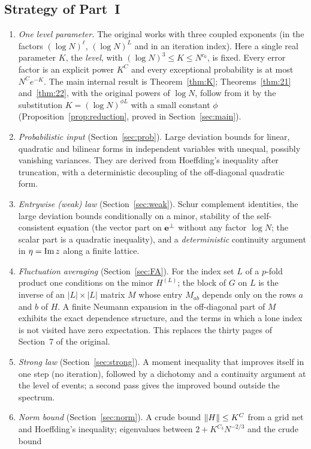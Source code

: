 \subsection{Strategy of Part~I}
\begin{enumerate}[leftmargin=2em,itemsep=2pt]
\item \emph{One level parameter.} The original works with three coupled exponents (in the factors $(\log N)^{\ell}$, $(\log N)^{L}$ and in an iteration index).
Here a single real parameter $K$, the \emph{level}, with $(\log N)^3\le K\le N^{c_0}$, is fixed. Every error factor is an explicit power $K^{C}$ and every exceptional
probability is at most $N^{C}e^{-K}$. The main internal result is Theorem~\ref{thm:K}; Theorems~\ref{thm:21} and~\ref{thm:22}, with the original powers of $\log N$, follow
from it by the substitution $K=(\log N)^{\phi L}$ with a small constant $\phi$ (Proposition~\ref{prop:reduction}, proved in Section~\ref{sec:main}).
\item \emph{Probabilistic input} (Section~\ref{sec:prob}). Large deviation bounds for linear, quadratic and bilinear forms in independent variables with unequal, possibly
vanishing variances. They are derived from Hoeffding's inequality after truncation, with a deterministic decoupling of the off-diagonal quadratic form.
\item \emph{Entrywise (weak) law} (Section~\ref{sec:weak}). Schur complement identities, the large deviation bounds conditionally on a minor, stability of the self-consistent
equation (the vector part on $\mathbf{e}^\perp$ without any factor $\log N$; the scalar part is a quadratic inequality), and a \emph{deterministic} continuity argument in
$\eta=\operatorname{Im} z$ along a finite lattice.
\item \emph{Fluctuation averaging} (Section~\ref{sec:FA}). For the index set $L$ of a $p$-fold product one conditions on the minor $H^{(L)}$; the block of $G$ on $L$ is the inverse of an
$|L|\times|L|$ matrix $M$ whose entry $M_{ab}$ depends only on the rows $a$ and $b$ of $H$. A finite Neumann expansion in the off-diagonal part of $M$ exhibits the exact dependence
structure, and the terms in which a lone index is not visited have zero expectation. This replaces the thirty pages of Section~7 of the original.
\item \emph{Strong law} (Section~\ref{sec:strong}). A moment inequality that improves itself in one step (no iteration), followed by a dichotomy and a continuity argument at the level
of events; a second pass gives the improved bound outside the spectrum.
\item \emph{Norm bound} (Section~\ref{sec:norm}). A crude bound $\|H\|\le K^{C}$ from a grid net and Hoeffding's inequality; eigenvalues between $2+K^{C_3}N^{-2/3}$ and the crude bound

\end{enumerate}
